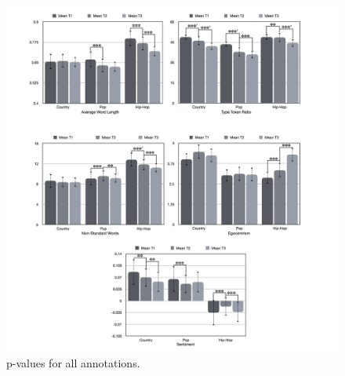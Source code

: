 \documentclass[11pt,a4paper]{article}
\begin{document}
\begin{figure}[t!]
\includegraphics[width=\textwidth]{all_pvals.png}
\caption{p-values for all annotations.}
\label{fig:pvals}
\end{figure}
\end{document}
